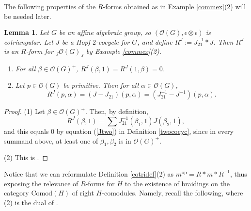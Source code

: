 \documentclass{amsart}
\numberwithin{equation}{section}
\newtheorem{lemma}[theorem]{Lemma}
\theoremstyle{definition}
\begin{document}
The following properties of the $R$-forms obtained as in Example \ref{commex}(2) will be needed later.

\begin{lemma}\label{quick} 
Let $G$ be an affine algebraic group, so $(\mathcal{O}(G),\epsilon \otimes \epsilon)$ is cotriangular. Let $J$ be a Hopf $2$-cocycle for $G$, and define $ R^J:=J_{21}^{-1}\ast J$. 
Then $R^J$ is an $R$-form for ${}_J\mathcal{O}(G)_J$ by Example \ref{commex}(2). 
\begin{enumerate}
\item For all $\beta \in \mathcal{O}(G)^+$, $R^J(\beta,1) = R^J(1,\beta) = 0$.
\item Let $p  \in \mathcal{O}(G)$ be primitive. Then for all $\alpha \in \mathcal{O}(G)$,
$$  R^J(p,\alpha)=(J - J_{21})(p,\alpha)= (J_{21}^{-1} - J^{-1})(p,\alpha) .$$
\end{enumerate}
\end{lemma}

\begin{proof} 
(1) Let $\beta \in \mathcal{O}(G)^+$. Then, by definition,  
$$R^J(\beta,1) = \sum J_{21}^{-1}(\beta_1,1)J(\beta_2,1),$$
and this equals 0 by equation (\ref{Jtwo}) in Definition \ref{twococyc}, since in every summand above, at least one of $\beta_1, \beta_2$ is in $\mathcal{O}(G)^+$.

(2) This is \cite[Lemma 2.3]{G2}.
\end{proof}

Notice that we can reformulate Definition \ref{cotridef}(2) as
$m^{\mathrm{op}}=R \ast m \ast R^{-1}$, 
thus exposing the relevance of $R$-forms for $H$ to the existence of braidings on the category $\mathrm{Comod}(H)$ of right $H$-comodules. Namely, recall the following, where (2) is the dual of \cite[Proposition 8.3.14]{EGNO}.
\end{document}
